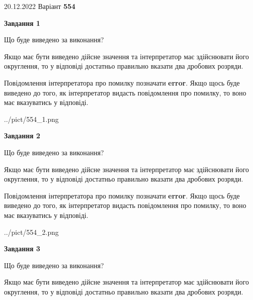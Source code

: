 \documentclass[12pt, ukrainian]{article}
\begin{document}
{20.12.2022 Варіант \No \textbf { 554 }\par}
{
\begin {Large}

{\begin {center}\textbf{Завдання 1}\end {center}}\par
Що буде виведено за виконання? \par

Якщо має бути виведено дійсне значення та інтерпретатор має здійснювати його округлення, 
то у відповіді достатньо правильно вказати два дробових розряди.

Повідомлення інтерпретатора про помилку позначати \textbf{error}.
Якщо щось буде виведено до того, як інтерпретатор видасть повідомлення про помилку, 
то воно має вказуватись у відповіді. \par

\begin{center}
	{../pict/554_1.png}
\end{center}
\newpage

{\begin {center}\textbf{Завдання 2}\end {center}}\par
Що буде виведено за виконання? \par

Якщо має бути виведено дійсне значення та інтерпретатор має здійснювати його округлення, 
то у відповіді достатньо правильно вказати два дробових розряди.

Повідомлення інтерпретатора про помилку позначати \textbf{error}.
Якщо щось буде виведено до того, як інтерпретатор видасть повідомлення про помилку, 
то воно має вказуватись у відповіді. \par

\begin{center}
	{../pict/554_2.png}
\end{center}
\newpage

{\begin {center}\textbf{Завдання 3}\end {center}}\par
Що буде виведено за виконання? \par

Якщо має бути виведено дійсне значення та інтерпретатор має здійснювати його округлення, 
то у відповіді достатньо правильно вказати два дробових розряди.


\end{Large}}
\end{document}
